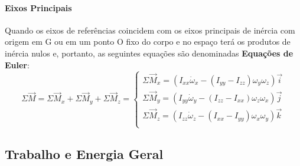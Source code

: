\documentclass{article}
\begin{document}
            \paragraph{Eixos Principais}Quando os eixos de referências coincidem com os eixos principais de inércia com origem em G ou em um ponto O fixo do corpo e no espaço terá os produtos de inércia nulos e, portanto, as seguintes equações são denominadas \textbf{Equações de Euler}:
                \begin{equation}
                    \boxed{
                        \Sigma\vec{M} = 
                        \Sigma\vec{M}_{x} + 
                        \Sigma\vec{M}_{y} + 
                        \Sigma\vec{M}_{z} = 
                        \begin{cases}
                            \Sigma\vec{M}_{x} = (I_{xx}\dot{\omega}_{x} - (I_{yy} - I_{zz})\omega_{y}\omega_{z})\vec{i}\\
                            \Sigma\vec{M}_{y} = (I_{yy}\dot{\omega}_{y} - (I_{zz} - I_{xx})\omega_{z}\omega_{x})\vec{j}\\
                            \Sigma\vec{M}_{z} = (I_{zz}\dot{\omega}_{z} - (I_{xx} - I_{yy})\omega_{x}\omega_{y})\vec{k}\\
                        \end{cases}
                    }
                \end{equation}
\newpage

        \subsection{Trabalho e Energia Geral}
\end{document}
